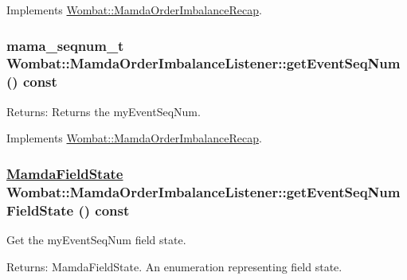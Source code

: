 Implements \hyperlink{classWombat_1_1MamdaOrderImbalanceRecap_5a99f2d259050eb8aa9e014ff7bb69de}{Wombat::Mamda\-Order\-Imbalance\-Recap}.\hypertarget{classWombat_1_1MamdaOrderImbalanceListener_3a6ecd36b855f2e1f122d07764a6b691}{
\subsubsection[getEventSeqNum]{\setlength{\rightskip}{0pt plus 5cm}mama\_\-seqnum\_\-t Wombat::Mamda\-Order\-Imbalance\-Listener::get\-Event\-Seq\-Num () const}}
\label{classWombat_1_1MamdaOrderImbalanceListener_3a6ecd36b855f2e1f122d07764a6b691}


\begin{Desc}
\item[Returns:]Returns the my\-Event\-Seq\-Num. \end{Desc}


Implements \hyperlink{classWombat_1_1MamdaOrderImbalanceRecap_f49f74200cc7ca60a7509f4801a1f74e}{Wombat::Mamda\-Order\-Imbalance\-Recap}.\hypertarget{classWombat_1_1MamdaOrderImbalanceListener_1daae80b39ea6a070f2fa736fe90437d}{
\subsubsection[getEventSeqNumFieldState]{\setlength{\rightskip}{0pt plus 5cm}\hyperlink{namespaceWombat_93aac974f2ab713554fd12a1fa3b7d2a}{Mamda\-Field\-State} Wombat::Mamda\-Order\-Imbalance\-Listener::get\-Event\-Seq\-Num\-Field\-State () const}}
\label{classWombat_1_1MamdaOrderImbalanceListener_1daae80b39ea6a070f2fa736fe90437d}


Get the my\-Event\-Seq\-Num field state. 

\begin{Desc}
\item[Returns:]Mamda\-Field\-State. An enumeration representing field state. \end{Desc}


